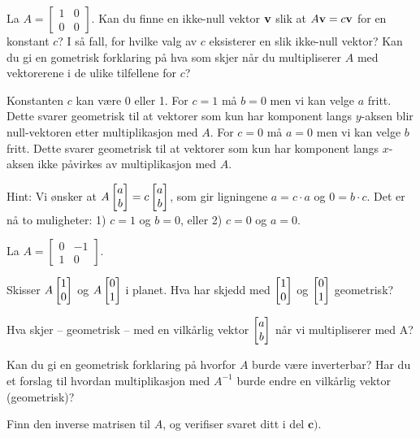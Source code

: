 \begin{oppgave}
La $A=\begin{bmatrix}
1 & 0\\
0 & 0
\end{bmatrix}$. Kan du finne en ikke-null vektor $\mathbf{v}$ slik at $A\mathbf{v}=c\mathbf{v}$ for en konstant $c$? I så fall, for hvilke valg av $c$ eksisterer en slik ikke-null vektor? Kan du gi en gometrisk forklaring på hva som skjer når du multipliserer $A$ med vektorerene i de ulike tilfellene for $c$?
\end{oppgave}



\begin{losning}

Konstanten $c$ kan være 0 eller 1. For $c=1$ må $b=0$ men vi kan velge $a$ fritt. Dette svarer geometrisk til at vektorer som kun har komponent langs $y$-aksen blir null-vektoren etter multiplikasjon med $A$. For $c=0$ må $a=0$ men vi kan velge $b$ fritt. Dette svarer geometrisk til at vektorer som kun har komponent langs $x$-aksen ikke påvirkes av multiplikasjon med $A$.


Hint: Vi ønsker at $A\begin{bmatrix} a \\ b \end{bmatrix}=c\begin{bmatrix} a \\ b \end{bmatrix}$, som gir ligningene $a=c\cdot a$ og $0=b\cdot c$. Det er nå to muligheter: 1) $c=1$ og $b=0$, eller 2) $c=0$ og $a=0$.



\end{losning}




\begin{oppgave}

La $A=\begin{bmatrix}
0 & -1\\
1 & 0
\end{bmatrix}.$

\begin{punkt}
Skisser $A\begin{bmatrix} 1 \\ 0 \end{bmatrix}$ og $A\begin{bmatrix} 0 \\ 1 \end{bmatrix}$ i planet. Hva har skjedd med $\begin{bmatrix} 1 \\ 0 \end{bmatrix}$ og $\begin{bmatrix} 0 \\ 1 \end{bmatrix}$ geometrisk?
\end{punkt}

\begin{punkt}
Hva skjer --  geometrisk -- med en vilkårlig vektor $\begin{bmatrix} a \\ b \end{bmatrix}$ når vi multipliserer med A?

\end{punkt}

\begin{punkt}
Kan du gi en geometrisk forklaring på hvorfor $A$ burde være inverterbar? Har du et forslag til hvordan multiplikasjon med $A^{-1}$ burde endre en vilkårlig vektor (geometrisk)?

\end{punkt}

\begin{punkt}
Finn den inverse matrisen til $A$, og verifiser svaret ditt i del $\textbf{c)}$.
\end{punkt}

\end{oppgave}

